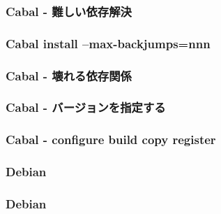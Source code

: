 \documentclass[cjk,dvipdfm,12pt]{beamer}
\begin{document}
\begin{frame}
\frametitle{Cabal - 難しい依存解決}
\end{frame}

\begin{frame}
\frametitle{Cabal install --max-backjumps=nnn}
\end{frame}


\begin{frame}
\frametitle{Cabal - 壊れる依存関係}
\end{frame}

\begin{frame}
\frametitle{Cabal - バージョンを指定する}
\end{frame}

\begin{frame}
\frametitle{}
\end{frame}

\begin{frame}
\frametitle{Cabal - configure build copy register }
\end{frame}


\begin{frame}
\frametitle{}
\end{frame}

\begin{frame}
\frametitle{Debian}
\end{frame}

\begin{frame}
\frametitle{Debian}
\end{frame}

\begin{frame}
\frametitle{}
\end{frame}
\end{document}

